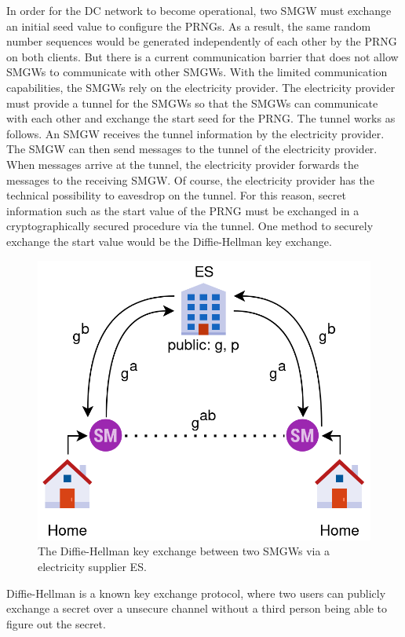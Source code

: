 In order for the DC network to become operational, two \gls{SMGW} must exchange an initial seed value to configure the \gls{PRNG}s. %
As a result, the same random number sequences would be generated independently of each other by the \gls{PRNG} on both clients. But there is a current communication barrier that does not allow \gls{SMGW}s to communicate with other \gls{SMGW}s. With the limited communication capabilities, the \gls{SMGW}s rely on the electricity provider. The electricity provider must provide a tunnel for the \gls{SMGW}s so that the \gls{SMGW}s can communicate with each other and exchange the start seed for the \gls{PRNG}. The tunnel works as follows. An \gls{SMGW} receives the tunnel information by the electricity provider. The \gls{SMGW} can then send messages to the tunnel of the electricity provider. When messages arrive at the tunnel, the electricity provider forwards the messages to the receiving \gls{SMGW}. Of course, the electricity provider has the technical possibility to eavesdrop on the tunnel. For this reason, secret information such as the start value of the \gls{PRNG} must be exchanged in a cryptographically secured procedure via the tunnel. One method to securely exchange the start value would be the Diffie-Hellman key exchange.\\
\begin{figure}[tbp]
  \centering
  \includegraphics[scale=0.7]{images/key_exchange2.png}
  \caption[Diffie-Hellman Key Exchange in TR-03109]{The Diffie-Hellman key exchange between two SMGWs via a electricity supplier \gls{ES}.}
  \label{fig:keyexchange}
\end{figure}Diffie-Hellman is a known key exchange protocol, where two users can publicly exchange a secret over a unsecure channel without a third person being able to figure out the secret. 
